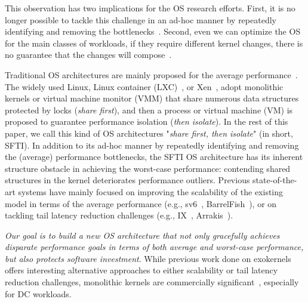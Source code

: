 \documentclass[pageno]{jpaper}
\begin{document}
 This observation has two implications for the OS research efforts.
 First, it is no longer  possible to tackle this challenge in  an ad-hoc manner by repeatedly identifying and removing the bottlenecks~\cite{unrau1995hierarchical, gough2007kernel, guniguntala2008read, mellor1991algorithms, russinovich2008inside}. Second, even we can optimize the OS for the main classes of workloads, if they require different kernel changes, there is no guarantee that the changes will compose~\cite{Belay:2012:DSU:2387880.2387913}.



 Traditional OS architectures are mainly proposed for the average performance~\cite{Saltzer:1974:PCI:361011.361067, Graham:1968:PIP:363095.363146, Chase:1994:SPS:195792.195795, Howry:1972:MSP:850614.850619, banga1999resource, barham2003xen}.
The widely used Linux, Linux container (LXC)~\cite{banga1999resource}, or Xen~\cite{barham2003xen}, adopt monolithic kernels or virtual machine monitor (VMM) that share numerous data structures protected by locks (\emph{share first}), and then a process or virtual machine (VM) is proposed to guarantee performance isolation (\emph{then isolate}). In the rest of this paper, we call this kind of OS architectures "\emph{share first, then isolate}" (in short, SFTI).
 In addition to its ad-hoc manner by repeatedly identifying and removing the  (average) performance bottlenecks, the SFTI OS architecture has its inherent structure obstacle in achieving the worst-case performance: contending shared structures in the kernel deteriorates performance outliers. Previous state-of-the-art systems have mainly focused on improving the scalability of the existing model in terms of the average performance (e.g., sv6~\cite{clements2015scalable}, BarrelFish~\cite{Baumann:2009:multikernel}),  or on tackling tail latency reduction challenges (e.g., IX~\cite{belay2014ix}, Arrakis~\cite{peter2014arrakis}).

 \emph{Our goal is to build a new OS architecture that not only gracefully achieves disparate performance goals in terms of both average and worst-case performance, but also protects software investment}.
 While previous work done on exokernels~\cite{peter2014arrakis, Baumann:2009:multikernel, belay2014ix, Belay:2012:DSU:2387880.2387913, boyd2008corey}
offers interesting alternative approaches to either scalability or tail latency reduction challenges, monolithic kernels are  commercially significant~\cite{banga1999resource}, especially for DC workloads.
\end{document}
